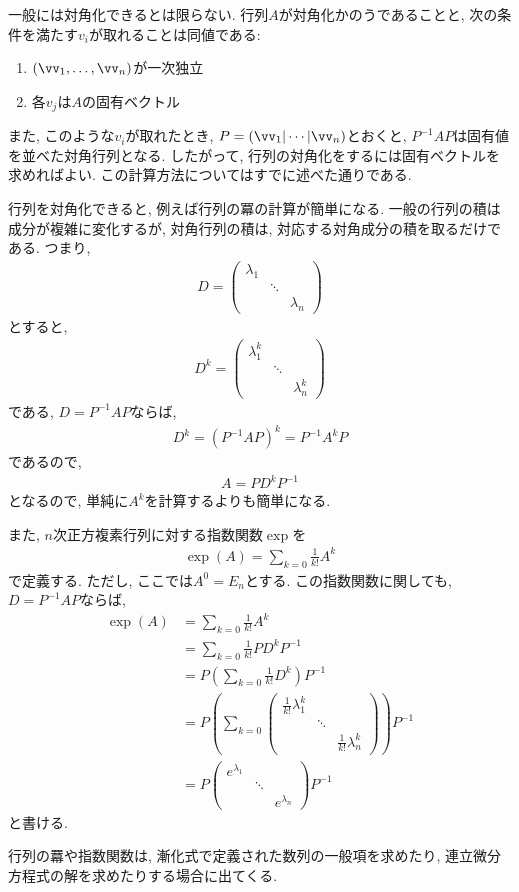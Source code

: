 一般には対角化できるとは限らない.
行列$A$が対角化かのうであることと,
次の条件を満たす$v_i$が取れることは同値である:
\begin{enumerate}
\item $(\vv_1,\ldots,\vv_n)$が一次独立
\item  各$v_j$は$A$の固有ベクトル
\end{enumerate}
また, このような$v_i$が取れたとき,
$P=(\vv_1|\cdots|\vv_n)$とおくと,
$P^{-1}AP$は固有値を並べた対角行列となる.
したがって, 行列の対角化をするには固有ベクトルを求めればよい.
この計算方法についてはすでに述べた通りである.

行列を対角化できると,
例えば行列の冪の計算が簡単になる.
一般の行列の積は成分が複雑に変化するが,
対角行列の積は, 対応する対角成分の積を取るだけである.
つまり,
\begin{align*}
D=\begin{pmatrix}\lambda_1&&\\&\ddots&\\&&\lambda_n\end{pmatrix}
\end{align*}
とすると,
\begin{align*}
D^k=\begin{pmatrix}\lambda_1^k&&\\&\ddots&\\&&\lambda_n^k\end{pmatrix}
\end{align*}
である,
$D=P^{-1}AP$ならば,
\begin{align*}
  D^k=(P^{-1}AP)^k=P^{-1}A^kP
\end{align*}
であるので,
\begin{align*}
  A=PD^kP^{-1}
\end{align*}
となるので, 単純に$A^k$を計算するよりも簡単になる.

また, $n$次正方複素行列に対する指数関数$\exp$を
\begin{align*}
\exp(A)=\sum_{k=0}\frac{1}{k!}A^k
\end{align*}
で定義する.
ただし, ここでは$A^0=E_n$とする.
この指数関数に関しても,
$D=P^{-1}AP$ならば,
\begin{align*}
  \exp(A)&=\sum_{k=0}\frac{1}{k!}A^k\\
  &=\sum_{k=0}\frac{1}{k!}PD^kP^{-1}\\
  &=P(\sum_{k=0}\frac{1}{k!}D^k)P^{-1}\\
  &=P(\sum_{k=0}\begin{pmatrix}\frac{1}{k!}\lambda_1^k&&\\&\ddots&\\&&\frac{1}{k!}\lambda_n^k\end{pmatrix})P^{-1}\\
  &=P\begin{pmatrix}e^{\lambda_1}&&\\&\ddots&\\&&e^{\lambda_n}\end{pmatrix}P^{-1}
\end{align*}
と書ける.

\begin{remark}
  行列の羃や指数関数は,
  漸化式で定義された数列の一般項を求めたり,
  連立微分方程式の解を求めたりする場合に出てくる.
\end{remark}
